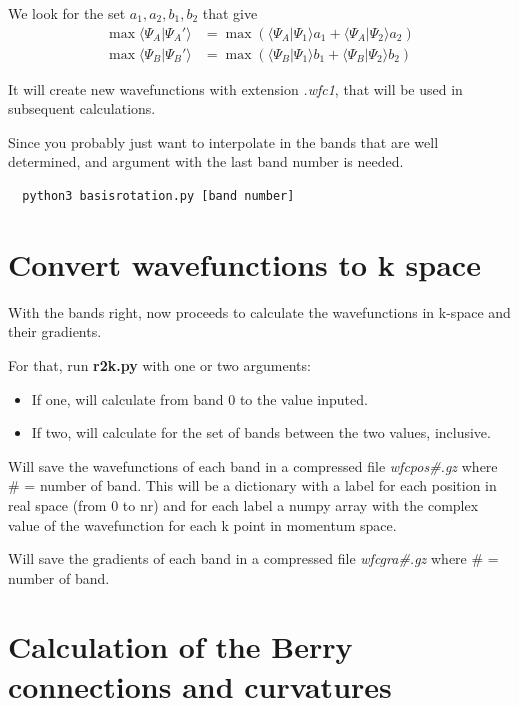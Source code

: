 \documentclass[a4paper,12pt]{report}
\begin{document}
 We look for the set $a_1, a_2, b_1, b_2$ that give
 \begin{align*}
  \max \langle \Psi_A|\Psi_A'\rangle &= \max \left( \langle \Psi_A|\Psi_1\rangle a_1 + \langle \Psi_A|\Psi_2\rangle a_2\right) \\
  \max \langle \Psi_B|\Psi_B'\rangle &= \max \left( \langle \Psi_B|\Psi_1\rangle b_1 + \langle \Psi_B|\Psi_2\rangle b_2\right)
 \end{align*}



 It will create new wavefunctions with extension \emph{.wfc1}, that will be used in subsequent calculations.

 Since you probably just want to interpolate in the bands that are well determined, and argument with the last band number
 is needed.
 \begin{verbatim}
  python3 basisrotation.py [band number]
 \end{verbatim}

\section{Convert wavefunctions to k space}

With the bands right, now proceeds to calculate the wavefunctions in k-space and their gradients.

For that, run \textbf{r2k.py} with one or two arguments:
\begin{itemize}
 \item If one, will calculate from band 0 to the value inputed.
 \item If two, will calculate for the set of bands between the two values, inclusive.
\end{itemize}

 Will save the wavefunctions of each band in a compressed file \emph{wfcpos\#.gz} where \# = number of band.
 This will be a dictionary with a label for each position in real space (from 0 to nr) and for each label
 a numpy array with the complex value of the wavefunction for each k point in momentum space.

 Will save the gradients of each band in a compressed file \emph{wfcgra\#.gz} where \# = number of band.

\section{Calculation of the Berry connections and curvatures}
\end{document}
